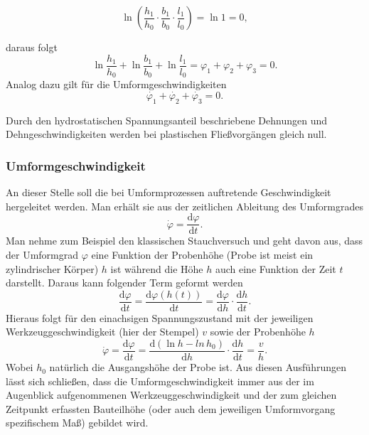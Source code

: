\documentclass[12pt,a4paper,parskip,twoside,BCOR5mm,headsepline]{scrartcl}
\begin{document}
\begin{description*}
\begin{itemize*}
 
 \begin{equation}\ln (\frac{h_1}{h_0} \cdot \frac{b_1}{b_0} \cdot \frac{l_1}{l_0}) = \ln 1 = 0,\end{equation} 
 
daraus folgt \begin{equation}
\ln\frac{h_1}{h_0}+\ln\frac{b_1}{b_0}+\ln\frac{l_1}{l_0}=\varphi_1+\varphi_2+\varphi_3=0
.\end{equation}
Analog dazu gilt für die Umformgeschwindigkeiten
\begin{equation}
\dot{\varphi_1}+\dot{\varphi_2}+\dot{\varphi_3}=0
.\end{equation}

Durch den hydrostatischen Spannungsanteil beschriebene Dehnungen und Dehngeschwindigkeiten werden bei plastischen Fließvorgängen gleich null. \autocite[24-28]{fu}
\subsubsection{Umformgeschwindigkeit}
An dieser Stelle soll die bei Umformprozessen auftretende Geschwindigkeit hergeleitet werden. Man erhält sie aus der zeitlichen Ableitung des Umformgrades
\begin{equation}
\dot{\varphi} = \frac{\text{d}\varphi}{\text{d}t}
.\end{equation}
Man nehme zum Beispiel den klassischen Stauchversuch und geht davon aus, dass der Umformgrad $ \varphi $ eine Funktion der Probenhöhe (Probe ist meist ein zylindrischer Körper) $ h $ ist während die Höhe $ h $ auch eine Funktion der Zeit $ t $ darstellt. Daraus kann folgender Term geformt werden 
\begin{equation}
\frac{\text{d}\varphi}{\text{d}t} = \frac{\text{d} \varphi (h(t))}{\text{d}t}= \frac{\text{d}\varphi}{\text{d}h} \cdot \frac{\text{d}h}{\text{d}t}
.\end{equation}
Hieraus folgt für den einachsigen Spannungszustand mit der jeweiligen Werkzeuggeschwindigkeit (hier der Stempel) $ v $ sowie der Probenhöhe $ h $
\begin{equation}
\dot{\varphi}=\frac{\text{d}\varphi}{\text{d}t}= \frac{\text{d}(\ln h - ln  \, h_0)}{\text{d}h}\cdot \frac{\text{d}h}{\text{d}t} = \frac{v}{h}
.\end{equation}
Wobei $ h_0 $ natürlich die Ausgangshöhe der Probe ist. \autocite[65]{hu}
Aus diesen Ausführungen lässt sich schließen,  dass die Umformgeschwindigkeit immer aus der im Augenblick aufgenommenen Werkzeuggeschwindigkeit und der zum gleichen Zeitpunkt erfassten Bauteilhöhe (oder auch dem jeweiligen Umformvorgang spezifischem   Maß) gebildet wird.

\end{itemize*}
\end{description*}
\end{document}
